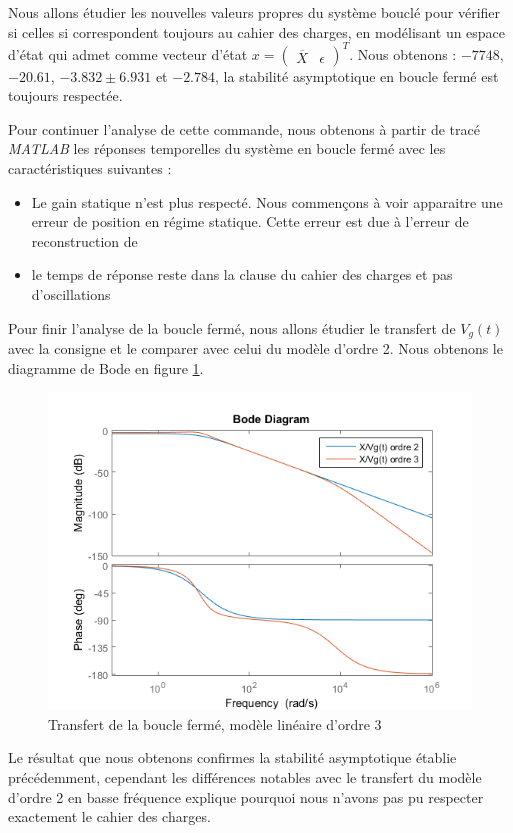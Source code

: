 Nous allons étudier les nouvelles valeurs propres du système bouclé pour vérifier si celles si correspondent toujours au cahier des charges, en modélisant un espace d'état qui admet comme vecteur d'état $x=\begin{pmatrix}
\overline{X}&\epsilon \end{pmatrix}^T$. Nous obtenons : $-7748$, $-20.61$, $ -3.832 \pm 6.931$ et $-2.784$, la stabilité asymptotique en boucle fermé est toujours respectée.



Pour continuer l'analyse de cette commande, nous obtenons à partir de tracé \emph{MATLAB} les réponses temporelles du système en boucle fermé avec les caractéristiques suivantes : \begin{itemize}
\item Le gain statique n'est plus respecté. Nous commençons à voir apparaitre une erreur de position en régime statique. Cette erreur est due à l'erreur de reconstruction de 
\item le temps de réponse reste dans la clause du cahier des charges et pas d'oscillations
\end{itemize} 


Pour finir l'analyse de la boucle fermé, nous allons étudier le transfert de $V_g(t)$ avec la consigne et le comparer avec celui du modèle d'ordre 2. Nous obtenons le diagramme de Bode en figure \ref{fig:transfertX/consigne}.
\begin{figure}[!ht]
\centering
\includegraphics[width = .5\textwidth]{./III/figure/bode_Tpert_EE1.png}
\caption{Transfert de la boucle fermé, modèle linéaire d'ordre 3\label{fig:transfertX/consigne}}
\end{figure}


Le résultat que nous obtenons confirmes la stabilité asymptotique établie précédemment, cependant les différences notables avec le transfert du modèle d'ordre 2 en basse fréquence explique pourquoi nous n'avons pas pu respecter exactement le cahier des charges. 

